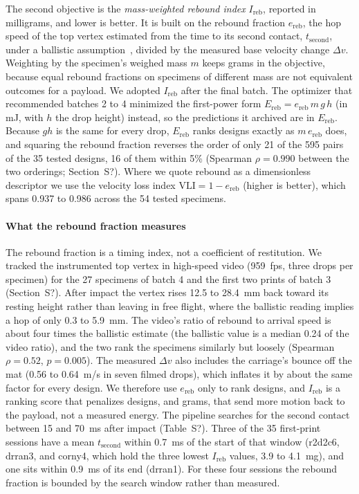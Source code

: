 \documentclass[11pt]{article}
\providecommand{\siref}[1]{S?}
\begin{document}
The second objective is the \emph{mass-weighted rebound index}
$I_{\mathrm{reb}}$, reported in milligrams, and lower is better. It is
built on the rebound fraction $e_{\mathrm{reb}}$, the hop speed of the
top vertex estimated from the time to its second contact,
$t_{\mathrm{second}}$, under a ballistic
assumption~\citep{bernstein1977listening}, divided by the measured base
velocity change $\Delta v$. Weighting by the specimen's weighed mass $m$
keeps grams in the objective, because equal rebound fractions on
specimens of different mass are not equivalent outcomes for a payload.
We adopted $I_{\mathrm{reb}}$ after the final batch. The optimizer that
recommended batches 2 to 4 minimized the first-power form
$E_{\mathrm{reb}} = e_{\mathrm{reb}}\, m\, g\, h$ (in mJ, with $h$ the
drop height) instead, so the predictions it archived are in
$E_{\mathrm{reb}}$. Because $g h$ is the same for every drop,
$E_{\mathrm{reb}}$ ranks designs exactly as $m\,e_{\mathrm{reb}}$ does,
and squaring the rebound fraction reverses the order of only 21 of the
595 pairs of the 35 tested designs, 16 of them within 5\% (Spearman
$\rho = 0.990$ between the two orderings; Section~\siref{si:rebound}).
Where we quote rebound as a dimensionless descriptor we use the velocity
loss index $\mathrm{VLI} = 1 - e_{\mathrm{reb}}$ (higher is better),
which spans 0.937 to 0.986 across the 54 tested specimens.

\paragraph{What the rebound fraction measures} The rebound fraction is
a timing index, not a coefficient of restitution. We tracked the
instrumented top vertex in high-speed video (\SI{959}{fps}, three drops
per specimen) for the 27 specimens of batch 4 and the first two prints
of batch 3 (Section~\siref{si:rebound}). After impact the vertex rises
12.5 to \SI{28.4}{mm} back toward its resting height rather than
leaving in free flight, where the ballistic reading implies a hop of
only 0.3 to \SI{5.9}{mm}. The video's ratio of rebound to arrival speed
is about four times the ballistic estimate (the ballistic value is a median 0.24 of the video ratio), and the
two rank the specimens similarly but loosely (Spearman $\rho = 0.52$,
$p = 0.005$). The measured $\Delta v$ also includes the carriage's
bounce off the mat (0.56 to \SI{0.64}{m/s} in seven filmed drops),
which inflates it by about the same factor for every design. We
therefore use $e_{\mathrm{reb}}$ only to rank designs, and
$I_{\mathrm{reb}}$ is a ranking score that penalizes designs, and grams,
that send more motion back to the payload, not a measured
energy. The pipeline searches for the second contact between 15 and
\SI{70}{ms} after impact (Table~\siref{tab:si-processing}). Three of the
35 first-print sessions have a mean $t_{\mathrm{second}}$ within
\SI{0.7}{ms} of the start of that window (r2d2c6, drran3, and corny4,
which hold the three lowest $I_{\mathrm{reb}}$ values, 3.9 to
\SI{4.1}{mg}), and one sits within \SI{0.9}{ms} of its end (drran1).
For these four sessions the rebound fraction is bounded by the search
window rather than measured.
\end{document}
